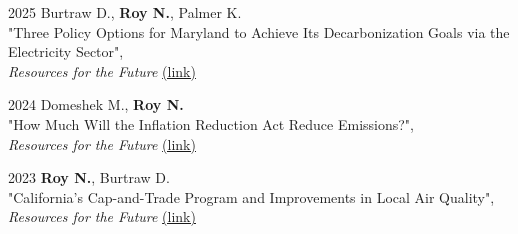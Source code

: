 \documentclass[margin]{res}
\begin{document}
\begin{resume}
2025 \hspace{4mm}%
    Burtraw D., \textbf{Roy N.}, Palmer K. \\
    \hspace*{16mm}
    "Three Policy Options for Maryland to Achieve Its Decarbonization Goals via the \\ \hspace*{16mm} Electricity Sector", \\
    \hspace*{16mm} \textit{Resources for the Future} \href{https://www.resources.org/common-resources/three-policy-options-for-maryland-to-achieve-its-decarbonization-goals-via-the-electricity-sector/}{(link)} %

2024 \hspace{4mm}%
    Domeshek M., \textbf{Roy N.} \\
    \hspace*{16mm}
    "How Much Will the Inflation Reduction Act Reduce Emissions?", \\
    \hspace*{16mm} \textit{Resources for the Future} \href{https://www.resources.org/archives/how-much-will-the-inflation-reduction-act-reduce-emissions/}{(link)} %

2023 \hspace{4mm}%
    \textbf{Roy N.}, Burtraw D. \\
    \hspace*{16mm}
    "California’s Cap-and-Trade Program and Improvements in Local Air Quality", \\
    \hspace*{16mm} \textit{Resources for the Future} \href{https://www.resources.org/archives/californias-cap-and-trade-program-and-improvements-in-local-air-quality/}{(link)} %


\end{resume}
\end{document}
